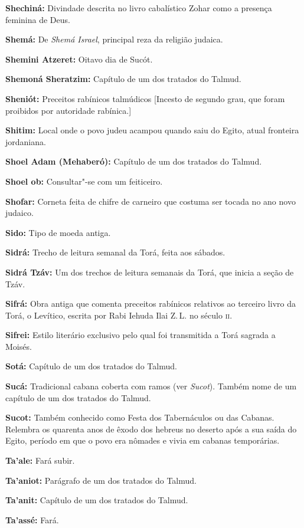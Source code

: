 \begin{hangparas}{.25in}{1}
{\textbf{Shechiná:} Divindade descrita no livro cabalístico Zohar 
como a presença feminina de Deus.

\textbf{Shemá:} De \emph{Shemá Israel}, principal reza da religião judaica.

\textbf{Shemini Atzeret:} Oitavo dia de Sucót.

\textbf{Shemoná Sheratzim:} Capítulo de um dos tratados do Talmud.

\textbf{Sheniót:} Preceitos rabínicos talmúdicos [Incesto de segundo grau, que foram proibidos por autoridade rabínica.]

\textbf{Shitim:} Local onde o povo judeu acampou quando saiu do Egito, 
atual fronteira jordaniana.

\textbf{Shoel Adam (Mehaberó):} Capítulo de um dos tratados do Talmud.

\textbf{Shoel ob:} Consultar"-se com um feiticeiro.

\textbf{Shofar:} Corneta feita de chifre de carneiro que costuma ser
tocada no ano novo judaico.

\textbf{Sido:} Tipo de moeda antiga.

\textbf{Sidrá:} Trecho de leitura semanal da Torá, feita aos sábados.

\textbf{Sidrá Tzáv:} Um dos trechos de leitura semanais da Torá, 
que inicia a seção de Tzáv.

\textbf{Sifrá:} Obra antiga que comenta preceitos rabínicos relativos
ao terceiro livro da Torá, o Levítico, escrita por Rabi Iehuda Ilai Z.\,L. no século \textsc{ii}.

\textbf{Sifrei:} Estilo literário exclusivo pelo qual
foi transmitida a Torá sagrada a Moisés.

\textbf{Sotá:} Capítulo de um dos tratados do Talmud.

\textbf{Sucá:} Tradicional cabana coberta com ramos (ver \emph{Sucot}). 
Também nome de um capítulo de um dos tratados do Talmud.

\textbf{Sucot:} Também conhecido como Festa dos Tabernáculos ou das Cabanas. 
Relembra os quarenta anos de êxodo dos hebreus no deserto após a sua saída 
do Egito, período em que o povo era nômades e vivia em cabanas temporárias.

\textbf{Ta'ale:} Fará subir.

\textbf{Ta'aniot:} Parágrafo de um dos tratados do Talmud.

\textbf{Ta'anit:} Capítulo de um dos tratados do Talmud.

\textbf{Ta'assé:} Fará.

}
\end{hangparas}
